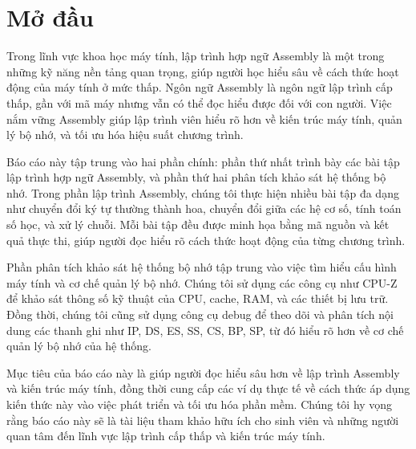 \chapter*{Mở đầu}

Trong lĩnh vực khoa học máy tính, lập trình hợp ngữ Assembly là một trong những kỹ năng nền tảng quan trọng, giúp người học hiểu sâu về cách thức hoạt động của máy tính ở mức thấp. Ngôn ngữ Assembly là ngôn ngữ lập trình cấp thấp, gần với mã máy nhưng vẫn có thể đọc hiểu được đối với con người. Việc nắm vững Assembly giúp lập trình viên hiểu rõ hơn về kiến trúc máy tính, quản lý bộ nhớ, và tối ưu hóa hiệu suất chương trình.

Báo cáo này tập trung vào hai phần chính: phần thứ nhất trình bày các bài tập lập trình hợp ngữ Assembly, và phần thứ hai phân tích khảo sát hệ thống bộ nhớ. Trong phần lập trình Assembly, chúng tôi thực hiện nhiều bài tập đa dạng như chuyển đổi ký tự thường thành hoa, chuyển đổi giữa các hệ cơ số, tính toán số học, và xử lý chuỗi. Mỗi bài tập đều được minh họa bằng mã nguồn và kết quả thực thi, giúp người đọc hiểu rõ cách thức hoạt động của từng chương trình.

Phần phân tích khảo sát hệ thống bộ nhớ tập trung vào việc tìm hiểu cấu hình máy tính và cơ chế quản lý bộ nhớ. Chúng tôi sử dụng các công cụ như CPU-Z để khảo sát thông số kỹ thuật của CPU, cache, RAM, và các thiết bị lưu trữ. Đồng thời, chúng tôi cũng sử dụng công cụ debug để theo dõi và phân tích nội dung các thanh ghi như IP, DS, ES, SS, CS, BP, SP, từ đó hiểu rõ hơn về cơ chế quản lý bộ nhớ của hệ thống.

Mục tiêu của báo cáo này là giúp người đọc hiểu sâu hơn về lập trình Assembly và kiến trúc máy tính, đồng thời cung cấp các ví dụ thực tế về cách thức áp dụng kiến thức này vào việc phát triển và tối ưu hóa phần mềm. Chúng tôi hy vọng rằng báo cáo này sẽ là tài liệu tham khảo hữu ích cho sinh viên và những người quan tâm đến lĩnh vực lập trình cấp thấp và kiến trúc máy tính.
